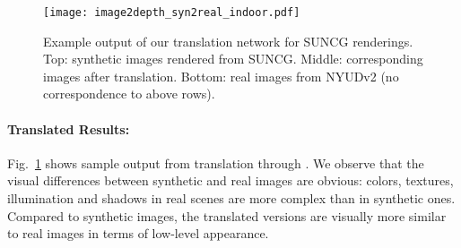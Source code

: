 \documentclass[runningheads]{llncs}
\begin{document}
\begin{figure}[tb!]
	\centering
	\texttt{[image: image2depth\_syn2real\_indoor.pdf]}
	\caption{Example output of our translation network for SUNCG\cite{song2017semantic} renderings. Top: synthetic images rendered from SUNCG. Middle: corresponding images after  translation. Bottom: real images from NYUDv2 \cite{silberman2012indoor} (no correspondence to above rows). 
	}
	\label{fig:syn2real_nyu}
\end{figure}

\paragraph{\bf Translated Results:} Fig.~\ref{fig:syn2real_nyu} shows sample output from translation through . We observe that the visual differences between synthetic and real images are obvious: colors, textures, illumination and shadows in real scenes are more complex than in synthetic ones. Compared to synthetic images, the translated versions are visually more similar to real images in terms of low-level appearance.
\end{document}

